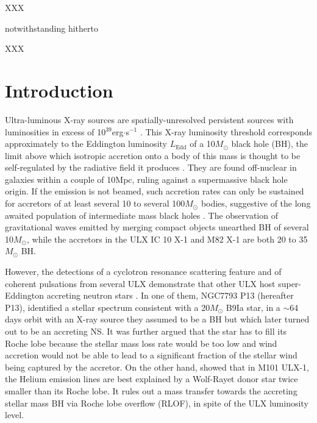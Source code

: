 \documentclass[letter]{aa}
\makeatletter
\newcommand*{\rlof}{RLOF\@\xspace}
\newcommand*{\ns}{NS\@\xspace}
\newcommand*{\bh}{BH\@\xspace}
\newcommand*{\msun}{$M_{\odot}$\@\xspace}
\newcommand*{\ledd}{$L_{\text{Edd}}$\@\xspace}
\makeatother
\begin{document}

   \maketitle
%

XXX

notwithstanding
hitherto

XXX

\section{Introduction}

Ultra-luminous X-ray sources are spatially-unresolved persistent sources with luminosities in excess of 10$^{39}$erg$\cdot$s$^{-1}$ \citep[see][for a recent review]{Kaaret2017}. This X-ray luminosity threshold corresponds approximately to the Eddington luminosity \ledd of a 10\msun black hole (\bh), the limit above which isotropic accretion onto a body of this mass is thought to be self-regulated by the radiative field it produces \citep{Rappaport2005}. They are found off-nuclear in galaxies within a couple of 10Mpc, ruling against a supermassive black hole origin. If the emission is not beamed, such accretion rates can only be sustained for accretors of at least several 10 to several 100\msun bodies, suggestive of the long awaited population of intermediate mass black holes \citep{Colbert1999}. The observation of gravitational waves emitted by merging compact objects unearthed \bh of several 10\msun, while the accretors in the ULX IC 10 X-1 \citep{Brandt1997,Prestwich2007,Silverman2008} and M82 X-1 \citep{Brightman2016} are both 20 to 35\msun \bh. 

However, the detections of a cyclotron resonance scattering feature and of coherent pulsations from several ULX demonstrate that other ULX host super-Eddington accreting neutron stars \citep[\ns,][]{Bachetti2014,Furst2016,Israel2017,Carpano2018,Brightman2018}. In one of them, NGC7793 P13 (hereafter P13), \cite{Motch2014} identified a stellar spectrum consistent with a 20\msun B9Ia star, in a $\sim$64 days orbit with an X-ray source they assumed to be a \bh but which later turned out to be an accreting \ns \citep{Furst2016}. It was further argued that the star has to fill its Roche lobe because the stellar mass loss rate would be too low and wind accretion would not be able to lead to a significant fraction of the stellar wind being captured by the accretor. On the other hand, \cite{Liu2013} showed that in M101 ULX-1, the Helium emission lines are best explained by a Wolf-Rayet donor star twice smaller than its Roche lobe. It rules out a mass transfer towards the accreting stellar mass \bh via Roche lobe overflow (\rlof), in spite of the ULX luminosity level. 
\end{document}
